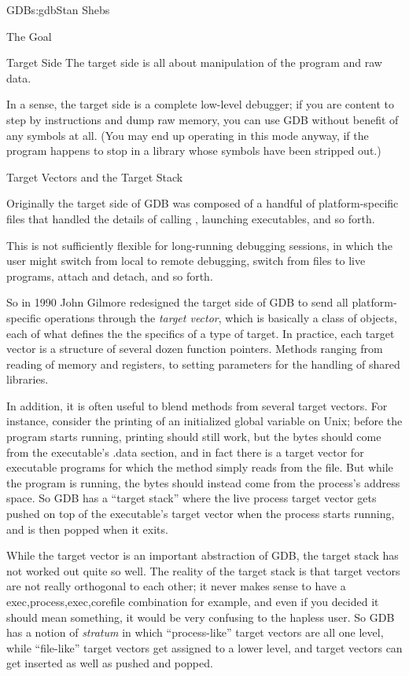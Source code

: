 \begin{aosachapter}{GDB}{s:gdb}{Stan Shebs}
\begin{aosasect1}{The Goal}
\begin{aosasect1}{Target Side}
The target side is all about manipulation of the program and raw data.

In a sense, the target side is a complete low-level debugger; if you
are content to step by instructions and dump raw memory, you can use
GDB without benefit of any symbols at all.  (You may end up operating
in this mode anyway, if the program happens to stop in a library whose
symbols have been stripped out.)

\begin{aosasect2}{Target Vectors and the Target Stack}

Originally the target side of GDB was composed of a handful of
platform-specific files that handled the details of calling
, launching executables, and so forth.

This is not sufficiently flexible for long-running debugging sessions,
in which the user might switch from local to remote debugging, switch
from files to live programs, attach and detach, and so forth.

So in 1990 John Gilmore redesigned the target side of GDB to send all
platform-specific operations through the {\em target vector}, which is
basically a class of objects, each of what defines the the specifics
of a type of target.  In practice, each target vector is a structure
of several dozen function pointers.  Methods ranging from reading of
memory and registers, to setting parameters for the handling of shared
libraries.

In addition, it is often useful to blend methods from several target
vectors.  For instance, consider the printing of an initialized global
variable on Unix; before the program starts running, printing should
still work, but the bytes should come from the executable's .data
section, and in fact there is a target vector for executable programs
for which the method simply reads from the file.  But while the
program is running, the bytes should instead come from the process's
address space.  So GDB has a ``target stack'' where the live process
target vector gets pushed on top of the executable's target vector
when the process starts running, and is then popped when it exits.


While the target vector is an important abstraction of GDB, the target
stack has not worked out quite so well.  The reality of the target
stack is that target vectors are not really orthogonal to each other;
it never makes sense to have a exec,process,exec,corefile combination
for example, and even if you decided it should mean something, it
would be very confusing to the hapless user.  So GDB has a notion of
{\em stratum} in which ``process-like'' target vectors are all one level,
while ``file-like'' target vectors get assigned to a lower level, and
target vectors can get inserted as well as pushed and popped.


\end{aosasect2}
\end{aosasect1}
\end{aosasect1}
\end{aosachapter}
